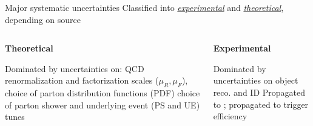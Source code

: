 \documentclass[10pt]{beamer}
\newcommand*{\Wjets}{\ensuremath{W+\text{jets}}}
\begin{document}
\begin{frame}{Major systematic uncertainties}
\centering
Classified into {\it \uline{experimental}} and {\it \uline{theoretical}}, depending on source
\vspace*{1.5\baselineskip}
\begin{columns}
	\begin{column}{0.5\linewidth}
\centering
{\bf Theoretical }
\begin{outline}
\1 Dominated by uncertainties on:
\vspace*{-\baselineskip}
	\2  QCD renormalization and factorization 
scales ($\mu_R, \mu_F$), 
	\2 choice of parton distribution functions (PDF)
	\2 choice of parton shower and underlying event (PS and UE) tunes
\end{outline}
\vspace*{-0.5\baselineskip}

\begin{table}[!h]
\begin{center}
\end{center}
\end{table}
	\end{column}
	\begin{column}{0.5\linewidth}
\centering
{\bf Experimental}
\begin{outline}
\1 Dominated by uncertainties on object reco. and ID
	\2 Propagated to \met; propagated to trigger efficiency
\end{outline}


\end{column}
\end{columns}
\end{frame}
\end{document}
